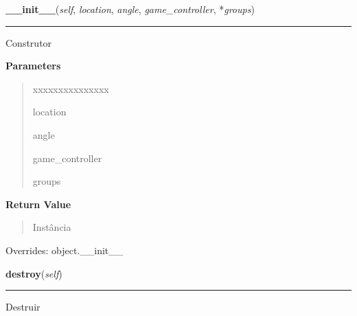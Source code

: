 \hspace{.8\funcindent}\begin{boxedminipage}{\funcwidth}

    \raggedright \textbf{\_\_init\_\_}(\textit{self}, \textit{location}, \textit{angle}, \textit{game\_controller}, *\textit{groups})

    \vspace{-1.5ex}

    \rule{\textwidth}{0.5\fboxrule}
\setlength{\parskip}{2ex}
    Construtor

\setlength{\parskip}{1ex}
      \textbf{Parameters}
      \vspace{-1ex}

      \begin{quote}
        \begin{Ventry}{xxxxxxxxxxxxxxx}

          \item[location]

          \item[angle]

          \item[game\_controller]

          \item[groups]

        \end{Ventry}

      \end{quote}

      \textbf{Return Value}
    \vspace{-1ex}

      \begin{quote}
      Instância

      \end{quote}

      Overrides: object.\_\_init\_\_

    \end{boxedminipage}

    \label{pygame-asteroids:bullet:Bullet:destroy}

    \vspace{0.5ex}

\hspace{.8\funcindent}\begin{boxedminipage}{\funcwidth}

    \raggedright \textbf{destroy}(\textit{self})

    \vspace{-1.5ex}

    \rule{\textwidth}{0.5\fboxrule}
\setlength{\parskip}{2ex}
    Destruir

\setlength{\parskip}{1ex}
    \end{boxedminipage}


